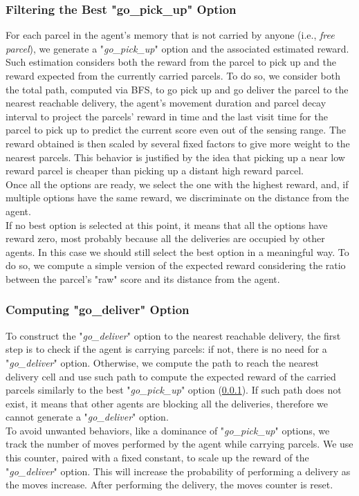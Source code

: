         \subsubsection{Filtering the Best "go\_pick\_up" Option}\label{best_pickup}
            For each parcel in the agent's memory that is not carried by anyone (i.e., \textit{free parcel}), we generate a "\textit{go\_pick\_up}" option and the associated estimated reward. Such estimation considers both the reward from the parcel to pick up and the reward expected from the currently carried parcels. To do so, we consider both the total path, computed via BFS, to go pick up and go deliver the parcel to the nearest reachable delivery, the agent's movement duration and parcel decay interval to project the parcels' reward in time and the last visit time for the parcel to pick up to predict the current score even out of the sensing range. The reward obtained is then scaled by several fixed factors to give more weight to the nearest parcels. This behavior is justified by the idea that picking up a near low reward parcel is cheaper than picking up a distant high reward parcel.
            \medskip\\
            Once all the options are ready, we select the one with the highest reward, and, if multiple options have the same reward, we discriminate on the distance from the agent.
            \medskip\\
            If no best option is selected at this point, it means that all the options have reward zero, most probably because all the deliveries are occupied by other agents. In this case we should still select the best option in a meaningful way. To do so, we compute a simple version of the expected reward considering the ratio between the parcel's "raw" score and its distance from the agent.
        
        \subsubsection{Computing "go\_deliver" Option}
            To construct the "\textit{go\_deliver}" option to the nearest reachable delivery, the first step is to check if the agent is carrying parcels: if not, there is no need for a "\textit{go\_deliver}" option. Otherwise, we compute the path to reach the nearest delivery cell and use such path to compute the expected reward of the carried parcels similarly to the best "\textit{go\_pick\_up}" option (\ref{best_pickup}). If such path does not exist, it means that other agents are blocking all the deliveries, therefore we cannot generate a "\textit{go\_deliver}" option.
            \medskip\\
            To avoid unwanted behaviors, like a dominance of "\textit{go\_pick\_up}" options, we track the number of moves performed by the agent while carrying parcels. We use this counter, paired with a fixed constant, to scale up the reward of the "\textit{go\_deliver}" option. This will increase the probability of performing a delivery as the moves increase. After performing the delivery, the moves counter is reset.

